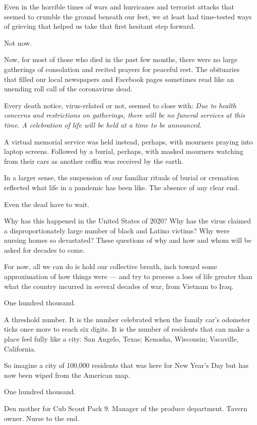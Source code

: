 Even in the horrible times of wars and hurricanes and terrorist attacks
that seemed to crumble the ground beneath our feet, we at least had
time-tested ways of grieving that helped us take that first hesitant
step forward.

Not now.

Now, for most of those who died in the past few months, there were no
large gatherings of consolation and recited prayers for peaceful rest.
The obituaries that filled our local newspapers and Facebook pages
sometimes read like an unending roll call of the coronavirus dead.

Every death notice, virus-related or not, seemed to close with:
\emph{Due to health concerns and restrictions on gatherings, there will
be no funeral services at this time. A celebration of life will be held
at a time to be announced.}

A virtual memorial service was held instead, perhaps, with mourners
praying into laptop screens. Followed by a burial, perhaps, with masked
mourners watching from their cars as another coffin was received by the
earth.

In a larger sense, the suspension of our familiar rituals of burial or
cremation reflected what life in a pandemic has been like. The absence
of any clear end.

Even the dead have to wait.

Why has this happened in the United States of 2020? Why has the virus
claimed a disproportionately large number of black and Latino victims?
Why were nursing homes so devastated? These questions of why and how and
whom will be asked for decades to come.

For now, all we can do is hold our collective breath, inch toward some
approximation of how things were --- and try to process a loss of life
greater than what the country incurred in several decades of war, from
Vietnam to Iraq.

One hundred thousand.

A threshold number. It is the number celebrated when the family car's
odometer ticks once more to reach six digits. It is the number of
residents that can make a place feel fully like a city: San Angelo,
Texas; Kenosha, Wisconsin; Vacaville, California.

So imagine a city of 100,000 residents that was here for New Year's Day
but has now been wiped from the American map.

One hundred thousand.

Den mother for Cub Scout Pack 9. Manager of the produce department.
Tavern owner. Nurse to the end.

